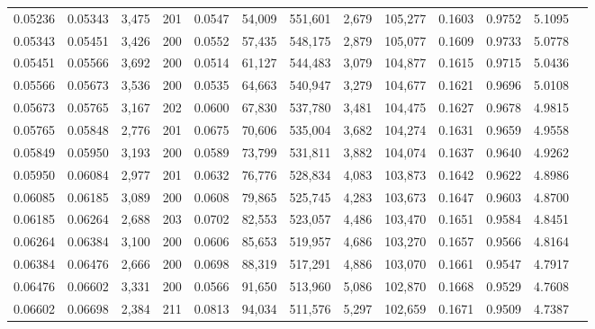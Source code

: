 \begin{tabular}{rrrrrrrrrrrrr}
0.05236 & 0.05343 & 3,475 & 201 &                                     0.0547 &  54,009 & 551,601 &   2,679 & 105,277 & 0.1603 & 0.9752 & 5.1095 \\
0.05343 & 0.05451 & 3,426 & 200 &                                     0.0552 &  57,435 & 548,175 &   2,879 & 105,077 & 0.1609 & 0.9733 & 5.0778 \\
0.05451 & 0.05566 & 3,692 & 200 &                                     0.0514 &  61,127 & 544,483 &   3,079 & 104,877 & 0.1615 & 0.9715 & 5.0436 \\
0.05566 & 0.05673 & 3,536 & 200 &                                     0.0535 &  64,663 & 540,947 &   3,279 & 104,677 & 0.1621 & 0.9696 & 5.0108 \\
0.05673 & 0.05765 & 3,167 & 202 &                                     0.0600 &  67,830 & 537,780 &   3,481 & 104,475 & 0.1627 & 0.9678 & 4.9815 \\
0.05765 & 0.05848 & 2,776 & 201 &                                     0.0675 &  70,606 & 535,004 &   3,682 & 104,274 & 0.1631 & 0.9659 & 4.9558 \\
0.05849 & 0.05950 & 3,193 & 200 &                                     0.0589 &  73,799 & 531,811 &   3,882 & 104,074 & 0.1637 & 0.9640 & 4.9262 \\
0.05950 & 0.06084 & 2,977 & 201 &                                     0.0632 &  76,776 & 528,834 &   4,083 & 103,873 & 0.1642 & 0.9622 & 4.8986 \\
0.06085 & 0.06185 & 3,089 & 200 &                                     0.0608 &  79,865 & 525,745 &   4,283 & 103,673 & 0.1647 & 0.9603 & 4.8700 \\
0.06185 & 0.06264 & 2,688 & 203 &                                     0.0702 &  82,553 & 523,057 &   4,486 & 103,470 & 0.1651 & 0.9584 & 4.8451 \\
0.06264 & 0.06384 & 3,100 & 200 &                                     0.0606 &  85,653 & 519,957 &   4,686 & 103,270 & 0.1657 & 0.9566 & 4.8164 \\
0.06384 & 0.06476 & 2,666 & 200 &                                     0.0698 &  88,319 & 517,291 &   4,886 & 103,070 & 0.1661 & 0.9547 & 4.7917 \\
0.06476 & 0.06602 & 3,331 & 200 &                                     0.0566 &  91,650 & 513,960 &   5,086 & 102,870 & 0.1668 & 0.9529 & 4.7608 \\
0.06602 & 0.06698 & 2,384 & 211 &                                     0.0813 &  94,034 & 511,576 &   5,297 & 102,659 & 0.1671 & 0.9509 & 4.7387 \\

\end{tabular}
